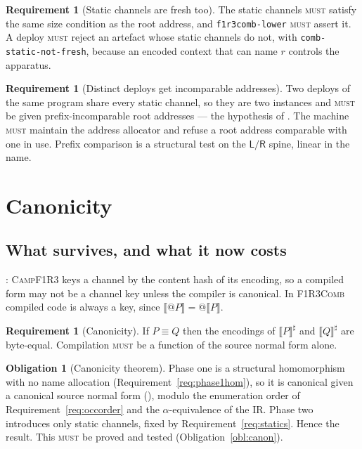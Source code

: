 \documentclass[11pt,a4paper]{article}
\makeatletter
\newcommand{\code}[1]{\texttt{#1}}
\newcommand{\Comb}{\textsc{F1R3Comb}}
\newcommand{\Camp}{\textsc{CampF1R3}}
\newcommand{\MUST}{\textsc{must}}
\newcommand{\quo}[1]{@#1}
\newcommand{\enc}[1]{\llbracket #1 \rrbracket}
\newcommand{\Lft}{\mathsf{L}}
\newcommand{\Rgt}{\mathsf{R}}
\newcommand{\scong}{\equiv}
\theoremstyle{definition}
\newtheorem{requirement}[definition]{Requirement}
\newtheorem{obligation}[definition]{Obligation}
\theoremstyle{plain}
\makeatother
\begin{document}
\begin{requirement}[Static channels are fresh too]\label{req:staticfresh}
The static channels \MUST{} satisfy the same size condition as the root
address, and \code{f1r3comb-lower} \MUST{} assert it. A deploy \MUST{} reject
an artefact whose static channels do not, with
\code{comb-static-not-fresh}, because an encoded context that can name $r$
controls the apparatus.
\end{requirement}

\begin{requirement}[Distinct deploys get incomparable addresses]\label{req:addrsep}
Two deploys of the same program share every static channel, so they are two
instances and \MUST{} be given prefix-incomparable root addresses ---
the hypothesis of \cite[Lem.~6.11]{draft3}. The machine \MUST{} maintain the
address allocator and refuse a root address comparable with one in use.
Prefix comparison is a structural test on the $\Lft/\Rgt$ spine, linear in the
name.
\end{requirement}

\section{Canonicity}\label{sec:canon}

\subsection{What survives, and what it now costs}

\cite[\S\,identity]{bytecode}: \Camp{} keys a channel by the content hash of
its encoding, so a compiled form may not be a channel key unless the compiler
is canonical. In \Comb{} compiled code is always a key, since
$\enc{\quo{P}} = \quo{\enc{P}}$.

\begin{requirement}[Canonicity]\label{req:canon}
If $P \scong Q$ then the encodings of $\enc{P}^{\sharp}$ and
$\enc{Q}^{\sharp}$ are byte-equal. Compilation \MUST{} be a function of the
source normal form alone.
\end{requirement}

\begin{obligation}[Canonicity theorem]\label{thm:canon}
Phase one is a structural homomorphism with no name allocation
(Requirement~\ref{req:phase1hom}), so it is canonical given a canonical source
normal form (\cite[Prop.~6.9]{k1ndl1ng}), modulo the enumeration order of
Requirement~\ref{req:occorder} and the $\alpha$-equivalence of the IR. Phase
two introduces only static channels, fixed by
Requirement~\ref{req:statics}. Hence the result. This \MUST{} be proved and
tested (Obligation~\ref{obl:canon}).
\end{obligation}
\end{document}
